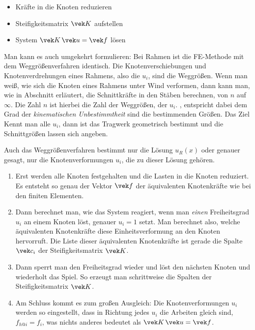 {\begin{itemize}
  \item Kr\"{a}fte in die Knoten reduzieren
  \item Steifigkeitsmatrix $\vek K$ aufstellen
  \item System $\vek K\,\vek u = \vek f$ l\"{o}sen
\end{itemize}
Man kann es auch umgekehrt formulieren: Bei Rahmen ist die FE-Methode mit dem Weggr\"{o}{\ss}enverfahren identisch.
Die Knotenverschiebungen und Knotenverdrehungen eines Rahmens, also die $u_i$, sind die Weggr\"{o}{\ss}en. Wenn man wei{\ss}, wie sich die Knoten eines Rahmens  unter Wind verformen, dann kann man, wie in Abschnitt erl\"{a}utert, die Schnittkr\"{a}fte in den St\"{a}ben berechnen, von $n$ auf $\infty$. Die Zahl $n$ ist hierbei die Zahl der Weggr\"{o}{\ss}en, der $u_i$. ,  entspricht dabei dem Grad der {\em kinematischen Unbestimmtheit\/}  sind die bestimmenden Gr\"{o}{\ss}en. Das Ziel Kennt man alle $u_i$, dann ist das Tragwerk geometrisch bestimmt und die Schnittgr\"{o}{\ss}en lassen sich angeben.

Auch das Weggr\"{o}{\ss}enverfahren bestimmt nur die L\"{o}sung $u_R(x)$ oder genauer gesagt, nur die Knotenverformungen $u_i$, die zu dieser L\"{o}sung geh\"{o}ren.\\

\begin{enumerate}
  \item Erst werden alle Knoten festgehalten und die Lasten in die Knoten reduziert. Es entsteht so genau der Vektor $\vek f$ der \"{a}quivalenten Knotenkr\"{a}fte wie bei den finiten Elementen.
  \item Dann berechnet man, wie das System reagiert, wenn man {\em einen\/} Freiheitsgrad $u_i$ an einem Knoten l\"{o}st, genauer $u_i = 1$ setzt. Man berechnet also, welche \"{a}quivalenten Knotenkr\"{a}fte diese Einheitsverformung an den Knoten hervorruft. Die Liste dieser \"{a}quivalenten Knotenkr\"{a}fte ist gerade die Spalte $\vek c_i$ der Steifigkeitsmatrix $\vek K$.
  \item Dann sperrt man den Freiheitsgrad wieder und l\"{o}st den n\"{a}chsten Knoten und wiederholt das Spiel. So erzeugt man schrittweise die Spalten der Steifigkeitsmatrix $\vek K$.
  \item Am Schluss kommt es zum gro{\ss}en Ausgleich: Die Knotenverformungen $u_i$ werden so eingestellt, dass in Richtung jedes $u_i$ die Arbeiten gleich sind, $f_{h @i} = f_i$, was nichts anderes bedeutet als $\vek K\,\vek u = \vek f$.
\end{enumerate}

}
